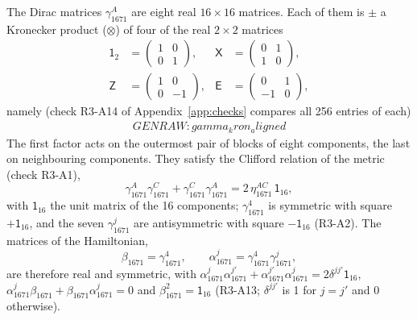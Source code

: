 The Dirac matrices $\gamma^A_{1671}$ are eight real $16\times16$ matrices. Each of them is
$\pm$ a Kronecker product ($\otimes$) of four of the real $2\times2$ matrices
\begin{equation}
\begin{aligned}
\mathsf 1_2&=\begin{pmatrix}1&0\\0&1\end{pmatrix},&
\mathsf X&=\begin{pmatrix}0&1\\1&0\end{pmatrix},\\
\mathsf Z&=\begin{pmatrix}1&0\\0&-1\end{pmatrix},&
\mathsf E&=\begin{pmatrix}0&1\\-1&0\end{pmatrix},
\end{aligned}
\label{eq:twobytwo}
\end{equation}
namely (check R3-A14 of Appendix~\ref{app:checks} compares all 256 entries of each)
\begin{equation}
\begin{aligned}
{{GENRAW:gamma_kron_aligned}}
\end{aligned}
\label{eq:gammas}
\end{equation}
The first factor acts on the outermost pair of blocks of eight components, the last on
neighbouring components. They satisfy the Clifford relation of the metric (check R3-A1),
\begin{equation}
\gamma^A_{1671}\gamma^C_{1671}+\gamma^C_{1671}\gamma^A_{1671}=2\,\eta_{1671}^{AC}\,\mathsf 1_{16},
\label{eq:clifford}
\end{equation}
with $\mathsf 1_{16}$ the unit matrix of the 16 components; $\gamma^4_{1671}$ is symmetric with
square $+\mathsf 1_{16}$, and the seven $\gamma^j_{1671}$ are antisymmetric with square
$-\mathsf 1_{16}$ (R3-A2). The matrices of the Hamiltonian,
\begin{equation}
\beta_{1671}=\gamma^4_{1671},\qquad \alpha^j_{1671}=\gamma^4_{1671}\gamma^j_{1671},
\label{eq:alphabeta}
\end{equation}
are therefore real and symmetric, with
$\alpha^j_{1671}\alpha^{j'}_{1671}+\alpha^{j'}_{1671}\alpha^j_{1671}=2\delta^{jj'}\mathsf 1_{16}$,
$\alpha^j_{1671}\beta_{1671}+\beta_{1671}\alpha^j_{1671}=0$ and $\beta_{1671}^2=\mathsf 1_{16}$
(R3-A13; $\delta^{jj'}$ is 1 for $j=j'$ and 0 otherwise).

